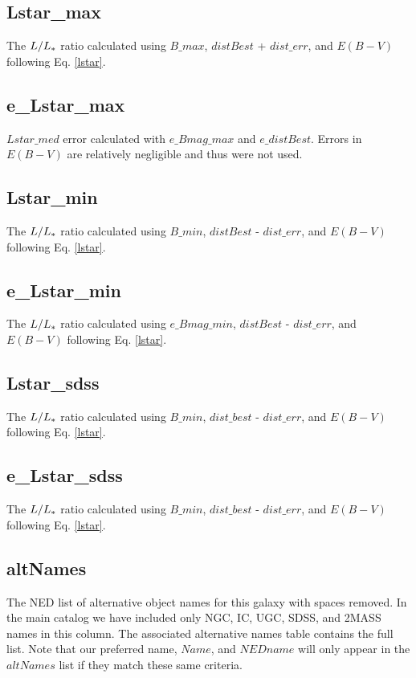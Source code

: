 \documentclass[iop]{emulateapj-rtx4}
\begin{document}
\subsection{Lstar\_max}
The $L / L_{\**}$ ratio calculated using $B\_max$, $distBest$ + $dist\_err$, and $E(B-V)$ following Eq. \ref{lstar}.

\subsection{e\_Lstar\_max}
$Lstar\_med$ error calculated with $e\_Bmag\_max$ and $e\_distBest$. Errors in $E(B-V)$ are relatively negligible and thus were not used.

\subsection{Lstar\_min}
The $L / L_{\**}$ ratio calculated using $B\_min$, $distBest$ - $dist\_err$, and $E(B-V)$ following Eq. \ref{lstar}.

\subsection{e\_Lstar\_min}
The $L / L_{\**}$ ratio calculated using $e\_Bmag\_min$, $distBest$ - $dist\_err$, and $E(B-V)$ following Eq. \ref{lstar}.

\subsection{Lstar\_sdss}
The $L / L_{\**}$ ratio calculated using $B\_min$, $dist\_best$ - $dist\_err$, and $E(B-V)$ following Eq. \ref{lstar}.

\subsection{e\_Lstar\_sdss}
The $L / L_{\**}$ ratio calculated using $B\_min$, $dist\_best$ - $dist\_err$, and $E(B-V)$ following Eq. \ref{lstar}.

\subsection{altNames}
The NED list of alternative object names for this galaxy with spaces removed. In the main catalog we have included only NGC, IC, UGC, SDSS, and 2MASS names in this column. The associated alternative names table contains the full list. Note that our preferred name, $Name$, and $NEDname$ will only appear in the $altNames$ list if they match these same criteria.
\end{document}

